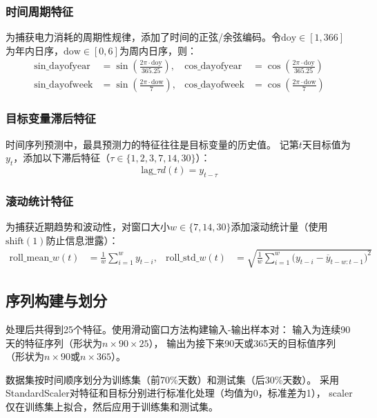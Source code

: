 \documentclass[12pt,a4paper]{ctexart}
\begin{document}
\subsubsection{时间周期特征}

为捕获电力消耗的周期性规律，添加了时间的正弦/余弦编码。令$\text{doy}\in[1,366]$为年内日序，$\text{dow}\in[0,6]$为周内日序，则：
\begin{align}
\text{sin\_dayofyear} &= \sin\left(\frac{2\pi \cdot \text{doy}}{365.25}\right), &
\text{cos\_dayofyear} &= \cos\left(\frac{2\pi \cdot \text{doy}}{365.25}\right) \\
\text{sin\_dayofweek} &= \sin\left(\frac{2\pi \cdot \text{dow}}{7}\right), &
\text{cos\_dayofweek} &= \cos\left(\frac{2\pi \cdot \text{dow}}{7}\right)
\end{align}

\subsubsection{目标变量滞后特征}

时间序列预测中，最具预测力的特征往往是目标变量的历史值。
记第$t$天目标值为$y_t$，添加以下滞后特征（$\tau \in \{1,2,3,7,14,30\}$）：
\begin{equation}
\text{lag\_}\tau d(t) = y_{t-\tau}
\end{equation}

\subsubsection{滚动统计特征}

为捕获近期趋势和波动性，对窗口大小$w \in \{7,14,30\}$添加滚动统计量（使用$\text{shift}(1)$防止信息泄露）：
\begin{align}
\text{roll\_mean\_}w(t) &= \frac{1}{w}\sum_{i=1}^{w} y_{t-i}, &
\text{roll\_std\_}w(t) &= \sqrt{\frac{1}{w}\sum_{i=1}^{w} \bigl(y_{t-i} - \overline{y}_{t-w:t-1}\bigr)^2}
\end{align}

\subsection{序列构建与划分}

处理后共得到25个特征。使用滑动窗口方法构建输入-输出样本对：
输入为连续90天的特征序列（形状为$n \times 90 \times 25$），
输出为接下来90天或365天的目标值序列（形状为$n \times 90$或$n \times 365$）。

数据集按时间顺序划分为训练集（前70\%天数）和测试集（后30\%天数）。
采用StandardScaler对特征和目标分别进行标准化处理（均值为0，标准差为1），
scaler仅在训练集上拟合，然后应用于训练集和测试集。
\end{document}
